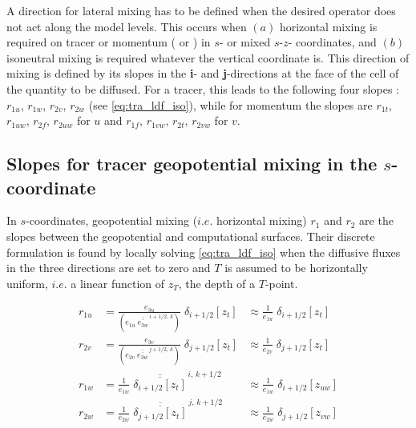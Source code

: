 \documentclass[../tex_main/NEMO_manual]{subfiles}
\begin{document}
A direction for lateral mixing has to be defined when the desired operator does 
not act along the model levels. This occurs when $(a)$ horizontal mixing is 
required on tracer or momentum ( or ) 
in $s$- or mixed $s$-$z$- coordinates, and $(b)$ isoneutral mixing is required 
whatever the vertical coordinate is. This direction of mixing is defined by its 
slopes in the \textbf{i}- and \textbf{j}-directions at the face of the cell of the 
quantity to be diffused. For a tracer, this leads to the following four slopes : 
$r_{1u}$, $r_{1w}$, $r_{2v}$, $r_{2w}$ (see \autoref{eq:tra_ldf_iso}), while 
for momentum the slopes are  $r_{1t}$, $r_{1uw}$, $r_{2f}$, $r_{2uw}$ for 
$u$ and  $r_{1f}$, $r_{1vw}$, $r_{2t}$, $r_{2vw}$ for $v$. 


\subsection{Slopes for tracer geopotential mixing in the $s$-coordinate}

In $s$-coordinates, geopotential mixing ($i.e.$ horizontal mixing) $r_1$ and 
$r_2$ are the slopes between the geopotential and computational surfaces. 
Their discrete formulation is found by locally solving \autoref{eq:tra_ldf_iso} 
when the diffusive fluxes in the three directions are set to zero and $T$ is 
assumed to be horizontally uniform, $i.e.$ a linear function of $z_T$, the 
depth of a $T$-point. 

\begin{equation} \label{eq:ldfslp_geo}
\begin{aligned}
 r_{1u} &= \frac{e_{3u}}{ \left( e_{1u}\;\overline{\overline{e_{3w}}}^{\,i+1/2,\,k} \right)}
 			  \;\delta_{i+1/2}[z_t] 
 		&\approx \frac{1}{e_{1u}}\; \delta_{i+1/2}[z_t] \ \ \
\\
 r_{2v} &= \frac{e_{3v}}{\left( e_{2v}\;\overline{\overline{e_{3w}}}^{\,j+1/2,\,k} \right)} 
 			  \;\delta_{j+1/2} [z_t] 
		&\approx \frac{1}{e_{2v}}\; \delta_{j+1/2}[z_t] \ \ \
\\
 r_{1w} &= \frac{1}{e_{1w}}\;\overline{\overline{\delta_{i+1/2}[z_t]}}^{\,i,\,k+1/2}
 		&\approx \frac{1}{e_{1w}}\; \delta_{i+1/2}[z_{uw}] 
 \\
 r_{2w} &= \frac{1}{e_{2w}}\;\overline{\overline{\delta_{j+1/2}[z_t]}}^{\,j,\,k+1/2}
		&\approx \frac{1}{e_{2w}}\; \delta_{j+1/2}[z_{vw}] 
 \\
\end{aligned}
\end{equation}
\end{document}
